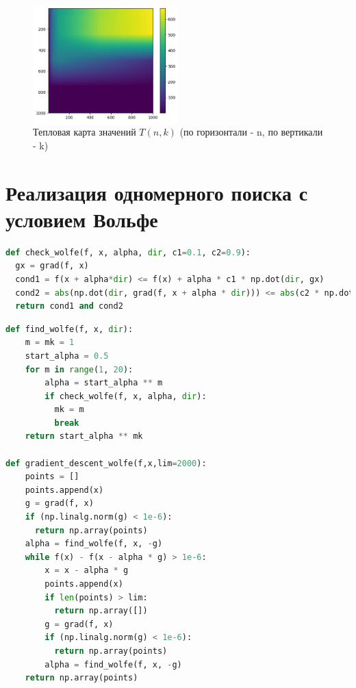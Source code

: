 \begin{figure}[ht]
    \centering
    \includegraphics[width=0.5\textwidth]{images/task6-7.jpg}
    \caption{Тепловая карта значений $T(n,k)$ (по горизонтали - n, по вертикали - k)}
    \label{fig:task6-7}
\end{figure}

\section{Реализация одномерного поиска с условием Вольфе}

\begin{lstlisting}[language=Python, caption=Проверка условия Вольфе]
def check_wolfe(f, x, alpha, dir, c1=0.1, c2=0.9):
  gx = grad(f, x)
  cond1 = f(x + alpha*dir) <= f(x) + alpha * c1 * np.dot(dir, gx)
  cond2 = abs(np.dot(dir, grad(f, x + alpha * dir))) <= abs(c2 * np.dot(dir, gx))
  return cond1 and cond2
\end{lstlisting}


\begin{lstlisting}[language=Python, caption=Нахождение коэффициента для условия Вольфе и градиентный спуск на основе условия Вольфе]
def find_wolfe(f, x, dir):
    m = mk = 1
    start_alpha = 0.5
    for m in range(1, 20):
        alpha = start_alpha ** m
        if check_wolfe(f, x, alpha, dir):
          mk = m
          break
    return start_alpha ** mk

def gradient_descent_wolfe(f,x,lim=2000):
    points = []
    points.append(x)
    g = grad(f, x)
    if (np.linalg.norm(g) < 1e-6):
      return np.array(points)
    alpha = find_wolfe(f, x, -g)
    while f(x) - f(x - alpha * g) > 1e-6:
        x = x - alpha * g
        points.append(x)
        if len(points) > lim:
          return np.array([])
        g = grad(f, x)
        if (np.linalg.norm(g) < 1e-6):
          return np.array(points)
        alpha = find_wolfe(f, x, -g)
    return np.array(points)
\end{lstlisting}



